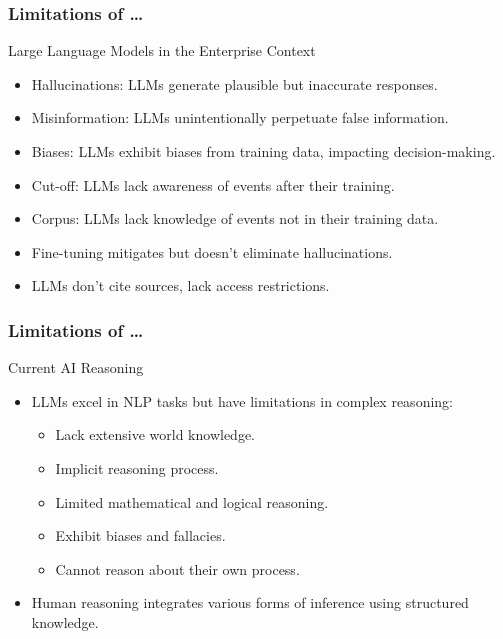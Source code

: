 


\begin{frame}[fragile]\frametitle{Limitations of \ldots}
Large Language Models in the Enterprise Context

\begin{itemize}
\item Hallucinations: LLMs generate plausible but inaccurate responses.
\item Misinformation: LLMs unintentionally perpetuate false information.
\item Biases: LLMs exhibit biases from training data, impacting decision-making.
\item Cut-off: LLMs lack awareness of events after their training.
\item Corpus: LLMs lack knowledge of events not in their training data.
\item Fine-tuning mitigates but doesn't eliminate hallucinations.
\item LLMs don't cite sources, lack access restrictions.
\end{itemize}	

\end{frame}

\begin{frame}[fragile]\frametitle{Limitations of \ldots}
Current AI Reasoning
    \begin{itemize}
        \item LLMs excel in NLP tasks but have limitations in complex reasoning:
        \begin{itemize}
            \item Lack extensive world knowledge.
            \item Implicit reasoning process.
            \item Limited mathematical and logical reasoning.
            \item Exhibit biases and fallacies.
            \item Cannot reason about their own process.
        \end{itemize}
        \item Human reasoning integrates various forms of inference using structured knowledge.
    \end{itemize}
\end{frame}

